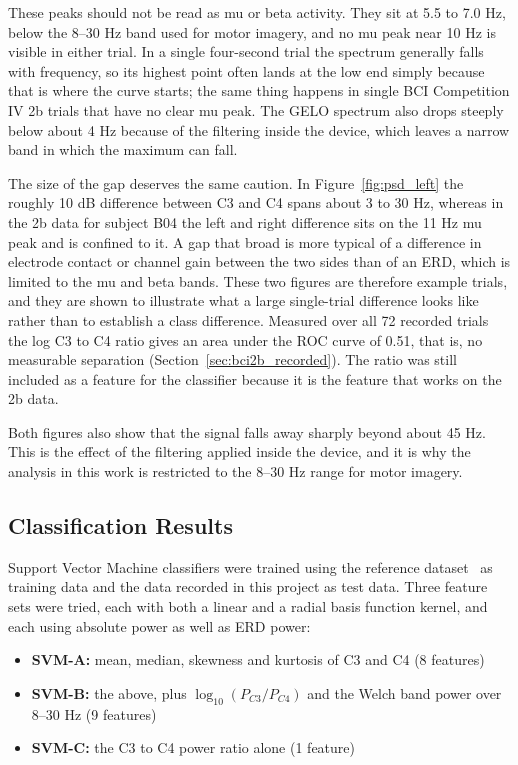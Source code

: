 These peaks should not be read as mu or beta activity. They sit at 5.5 to 7.0 Hz, below
the 8--30 Hz band used for motor imagery, and no mu peak near 10 Hz is visible in either
trial. In a single four-second trial the spectrum generally falls with frequency, so its
highest point often lands at the low end simply because that is where the curve starts;
the same thing happens in single BCI Competition IV 2b trials that have no clear mu peak.
The GELO spectrum also drops steeply below about 4 Hz because of the filtering inside the
device, which leaves a narrow band in which the maximum can fall.

The size of the gap deserves the same caution. In Figure~\ref{fig:psd_left} the roughly
10 dB difference between C3 and C4 spans about 3 to 30 Hz, whereas in the 2b data for
subject B04 the left and right difference sits on the 11 Hz mu peak and is confined to it.
A gap that broad is more typical of a difference in electrode contact or channel gain
between the two sides than of an ERD, which is limited to the mu and beta bands. These two
figures are therefore example trials, and they are shown to illustrate what a large
single-trial difference looks like rather than to establish a class difference. Measured
over all 72 recorded trials the log C3 to C4 ratio gives an area under the ROC curve of
0.51, that is, no measurable separation (Section~\ref{sec:bci2b_recorded}). The ratio was
still included as a feature for the classifier because it is the feature that works on the
2b data.

Both figures also show that the signal falls away sharply beyond about 45 Hz. This is the
effect of the filtering applied inside the device, and it is why the analysis in this work
is restricted to the 8--30 Hz range for motor imagery.

\FloatBarrier

\subsection{Classification Results}

Support Vector Machine classifiers were trained using the reference
dataset~\cite{liu2024mi} as training data and the data recorded in this project as test
data. Three feature sets were tried, each with both a linear and a radial basis function
kernel, and each using absolute power as well as ERD power:

\begin{itemize}
    \item \textbf{SVM-A:} mean, median, skewness and kurtosis of C3 and C4 (8 features)
    \item \textbf{SVM-B:} the above, plus $\log_{10}(P_{C3}/P_{C4})$ and the Welch band
          power over 8--30 Hz (9 features)
    \item \textbf{SVM-C:} the C3 to C4 power ratio alone (1 feature)
\end{itemize}

